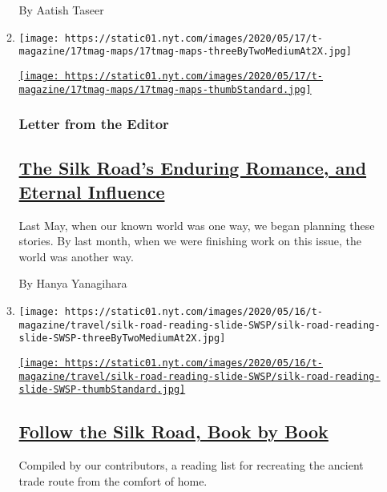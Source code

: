\begin{enumerate}
\begin{enumerate}
    By Aatish Taseer
  \item
    \texttt{[image: https://static01.nyt.com/images/2020/05/17/t-magazine/17tmag-maps/17tmag-maps-threeByTwoMediumAt2X.jpg]}

    \href{/2020/05/11/t-magazine/silk-road-travel-issue.html}{\texttt{[image: https://static01.nyt.com/images/2020/05/17/t-magazine/17tmag-maps/17tmag-maps-thumbStandard.jpg]}}

    \hypertarget{letter-from-the-editor}{%
    \subsubsection{Letter from the
    Editor}\label{letter-from-the-editor}}

    \hypertarget{the-silk-roads-enduring-romance-and-eternal-influence}{%
    \subsection{\texorpdfstring{\href{/2020/05/11/t-magazine/silk-road-travel-issue.html}{The
    Silk Road's Enduring Romance, and Eternal
    Influence}}{The Silk Road's Enduring Romance, and Eternal Influence}}\label{the-silk-roads-enduring-romance-and-eternal-influence}}

    Last May, when our known world was one way, we began planning these
    stories. By last month, when we were finishing work on this issue,
    the world was another way.

    By Hanya Yanagihara
  \item
    \texttt{[image: https://static01.nyt.com/images/2020/05/16/t-magazine/travel/silk-road-reading-slide-SWSP/silk-road-reading-slide-SWSP-threeByTwoMediumAt2X.jpg]}

    \href{/2020/05/11/t-magazine/silk-road-reading-list-books-movies.html}{\texttt{[image: https://static01.nyt.com/images/2020/05/16/t-magazine/travel/silk-road-reading-slide-SWSP/silk-road-reading-slide-SWSP-thumbStandard.jpg]}}

    \hypertarget{follow-the-silk-road-book-by-book}{%
    \subsection{\texorpdfstring{\href{/2020/05/11/t-magazine/silk-road-reading-list-books-movies.html}{Follow
    the Silk Road, Book by
    Book}}{Follow the Silk Road, Book by Book}}\label{follow-the-silk-road-book-by-book}}

    Compiled by our contributors, a reading list for recreating the
    ancient trade route from the comfort of home.
  \end{enumerate}
\end{enumerate}

